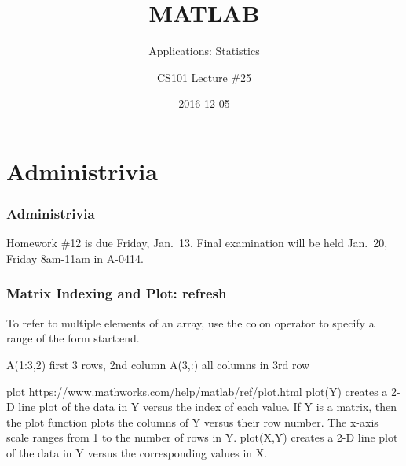 \documentclass[11pt]{beamer}
\title{MATLAB}
\subtitle{Applications:  Statistics}
\author{CS101 Lecture \#25}
\date{2016-12-05}
\begin{document}
  \setcounter{showProgressBar}{0}
  \setcounter{showSlideNumbers}{0}

\frame{\titlepage}

\setcounter{framenumber}{0}
\setcounter{showProgressBar}{1}
\setcounter{showSlideNumbers}{1}

\section{Administrivia}

\begin{frame}
  \frametitle{Administrivia}
  \Enlarge

   \begin{itemize}
   	\myitem  Homework \#12 is due Friday, Jan.\ 13.  %
   	\myitem  Final examination will be held Jan.\ 20, Friday 8am-11am in A-0414.  %
   \end{itemize}
\end{frame}

\begin{frame}[fragile]
	\frametitle{Matrix Indexing and Plot: refresh}
	
	\begin{enumerate}
		\myitem  To refer to multiple elements of an array, use the colon operator to specify a range of the form start:end. 
		\begin{enumerate}
			\mysubitem  A(1:3,2) first 3 rows, 2nd column
			\mysubitem  A(3,:)  all columns in 3rd row
		\end{enumerate}
		\myitem plot https://www.mathworks.com/help/matlab/ref/plot.html
		\myitem plot(Y) creates a 2-D line plot of the data in Y versus the index of each value. If Y is a matrix, then the plot function plots the columns of Y versus their row number. The x-axis scale ranges from 1 to the number of rows in Y.
		\myitem plot(X,Y) creates a 2-D line plot of the data in Y versus the corresponding values in X.
	\end{enumerate}
\end{frame}
\end{document}
